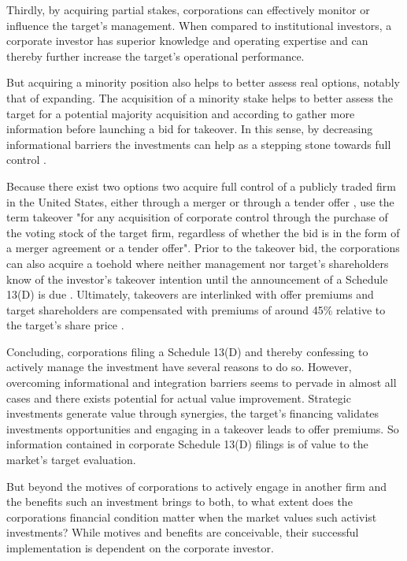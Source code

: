 \documentclass[12pt]{article}
\begin{document}
Thirdly, by acquiring partial stakes, corporations can effectively monitor or influence the target's management. When compared to institutional investors, a corporate investor has superior knowledge and operating expertise \citep[p.2792]{Allen2000} and can thereby further increase the target's operational performance.\par
But acquiring a minority position also helps to better assess real options, notably that of expanding. The acquisition of a minority stake helps to better assess the target for a potential majority acquisition \citep{Ouimet2013} and according to \citet[p.30]{Huang2017} gather more information before launching a bid for takeover. In this sense, by decreasing informational barriers the investments can help as a stepping stone towards full control \citep[p.3]{Huang2017}.\par
Because there exist two options two acquire full control of a publicly traded firm in the United States, either through a merger or through a tender offer \citep[p.2]{Offenberg2015}, \citet[p.1]{Betton2008} use the term takeover "for any acquisition of corporate control through the purchase of the voting stock of the target firm, regardless of whether the bid is in the form of a merger agreement or a tender offer".
Prior to the takeover bid, the corporations can also acquire a toehold where neither management nor target's shareholders know of the investor's takeover intention until the announcement of a Schedule 13(D) is due \citep[p.158]{Eckbo2009}. Ultimately, takeovers are interlinked with offer premiums and target shareholders are compensated with premiums of around 45\% relative to the target's share price \citep[p.154]{Eckbo2009}.\par
Concluding, corporations filing a Schedule 13(D) and thereby confessing to actively manage the investment have several reasons to do so. However, overcoming informational and integration barriers seems to pervade in almost all cases and there exists potential for actual value improvement. Strategic investments generate value through synergies, the target's financing validates investments opportunities and engaging in a takeover leads to offer premiums. So information contained in corporate Schedule 13(D) filings is of value to the market's target evaluation.\par
But beyond the motives of corporations to actively engage in another firm and the benefits such an investment brings to both, to what extent does the corporations financial condition matter when the market values such activist investments?  While motives and benefits are conceivable, their successful implementation is dependent on the corporate investor. 
\end{document}
